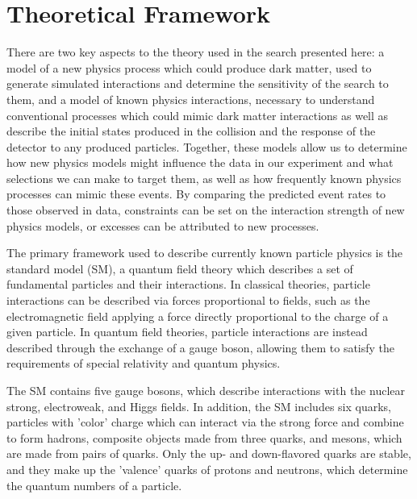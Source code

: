 \chapter{Theoretical Framework}
\label{theory}
There are two key aspects to the theory used in the search presented here: a model of a new physics process which could produce dark matter, used to generate simulated interactions and determine the sensitivity of the search to them, and a model of known physics interactions, necessary to understand conventional processes which could mimic dark matter interactions as well as describe the initial states produced in the collision and the response of the detector to any produced particles.
Together, these models allow us to determine how new physics models might influence the data in our experiment and what selections we can make to target them, as well as how frequently known physics processes can mimic these events.
By comparing the predicted event rates to those observed in data, constraints can be set on the interaction strength of new physics models, or excesses can be attributed to new processes.

The primary framework used to describe currently known particle physics is the standard model (SM), a quantum field theory which describes a set of fundamental particles and their interactions.
In classical theories, particle interactions can be described via forces proportional to fields, such as the electromagnetic field applying a force directly proportional to the charge of a given particle.
In quantum field theories, particle interactions are instead described through the exchange of a gauge boson, allowing them to satisfy the requirements of special relativity and quantum physics. 

The SM contains five gauge bosons, which describe interactions with the nuclear strong, electroweak, and Higgs fields.
In addition, the SM includes six quarks, particles with 'color' charge which can interact via the strong force and combine to form hadrons, composite objects made from three quarks, and mesons, which are made from pairs of quarks. 
Only the up- and down-flavored quarks are stable, and they make up the 'valence' quarks of protons and neutrons, which determine the quantum numbers of a particle.

